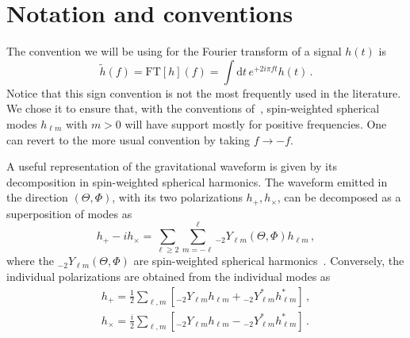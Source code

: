 \documentclass[aps,showpacs,twocolumn,
prd,superscriptaddress,nofootinbib]{revtex4-1}
\newcommand{\be}{\begin{equation}}
\newcommand{\ee}{\end{equation}}
\newcommand\ud{{\mathrm{d}}}
\begin{document}
\appendix

\section{Notation and conventions}
\label{sec:notation}

The convention we will be using for the Fourier transform of a signal $h(t)$ is
\be\label{eq:defFT}
	\tilde{h}(f) = \mathrm{FT}[h](f) =  \int \ud t \, e^{+2i\pi f t} h(t) \,.
\ee
Notice that this sign convention is not the most frequently used in the literature. We chose it to ensure that, with the conventions of~\cite{BlanchetLiving}, spin-weighted spherical modes $h_{\ell m}$ with $m>0$ will have support mostly for positive frequencies. One can revert to the more usual convention by taking $f\rightarrow -f$.

A useful representation of the gravitational waveform is given by its decomposition in spin-weighted spherical harmonics. The waveform emitted in the direction $(\Theta, \Phi)$, with its two polarizations $h_{+},h_{\times}$, can be decomposed as a superposition of modes as~\cite{Thorne80}
\be\label{eq:defmodes}
	h_{+} - i h_{\times} = \sum\limits_{\ell \geq 2} \sum\limits_{m=-\ell}^{\ell} {}_{-2}Y_{\ell m}(\Theta,\Phi) h_{\ell m} \,,
\ee
where the ${}_{-2}Y_{\ell m}(\Theta,\Phi)$ are spin-weighted spherical harmonics~\cite{Goldberg+67}. Conversely, the individual polarizations are obtained from the individual modes as
\begin{subequations}
\begin{align}
	h_{+} = \frac{1}{2} \sum\limits_{\ell, m} \left[ {}_{-2}Y_{\ell m}h_{\ell m} + {}_{-2}Y_{\ell m}^{*} h_{\ell m}^{*} \right] \,,\\
	h_{\times} = \frac{i}{2} \sum\limits_{\ell, m} \left[ {}_{-2}Y_{\ell m}h_{\ell m} - {}_{-2}Y_{\ell m}^{*} h_{\ell m}^{*} \right] \,.
\end{align}
\end{subequations}
\end{document}

